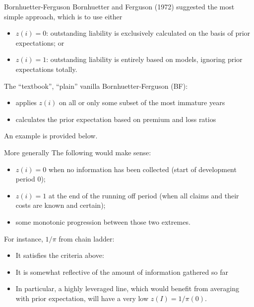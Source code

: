 \documentclass[
  ignorenonframetext,
  t,handout]{beamer}
\providecommand{\tightlist}{%
  \setlength{\itemsep}{0pt}\setlength{\parskip}{0pt}}
\begin{document}
\begin{frame}{Bornhuetter-Ferguson}
\label{bornhuetter-ferguson}
Bornhuetter and Ferguson (1972) suggested the most simple approach,
which is to use either

\begin{itemize}
\tightlist
\item
  \(z(i)=0\): outstanding liability is exclusively calculated on the
  basis of prior expectations; or
\item
  \(z(i)=1\): outstanding liability is entirely based on models,
  ignoring prior expectations totally.
\end{itemize}

The ``textbook'', ``plain'' vanilla Bornhuetter-Ferguson (BF):

\begin{itemize}
\tightlist
\item
  applies \(z(i)\) on all or only some subset of the most immature years
\item
  calculates the prior expectation based on premium and loss ratios
\end{itemize}

An example is provided below.
\end{frame}

\begin{frame}{More generally}
\label{more-generally}
The following would make sense:

\begin{itemize}
\tightlist
\item
  \(z(i)=0\) when no information has been collected (start of
  development period 0);
\item
  \(z(i)=1\) at the end of the running off period (when all claims and
  their costs are known and certain);
\item
  some monotonic progression between those two extremes.
\end{itemize}

For instance, \(1/\pi\) from chain ladder:

\begin{itemize}
\tightlist
\item
  It satisfies the criteria above:
\item
  It is somewhat reflective of the amount of information gathered so far
\item
  In particular, a highly leveraged line, which would benefit from
  averaging with prior expectation, will have a very low
  \(z(I) = 1/\pi(0)\).
\end{itemize}
\end{frame}
\end{document}
